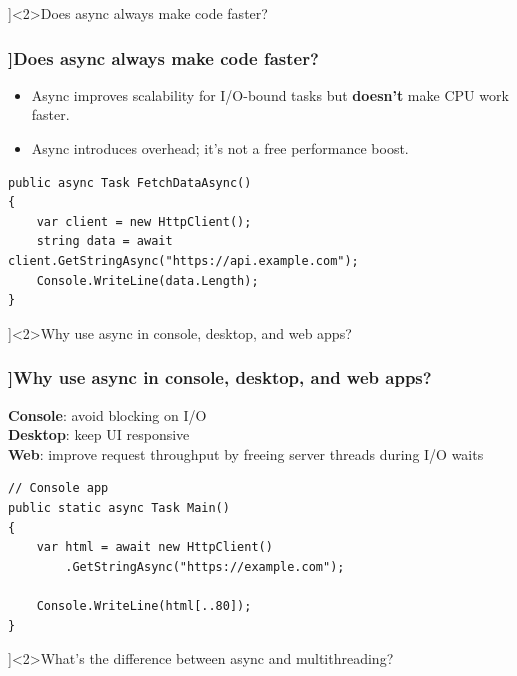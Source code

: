 \QuestionSlide[\CategoryBadge[PerfColor!20]{Async \& Threading}]<2>{Does async always make code faster?}

\begin{frame}[fragile]
  \frametitle{\AnswerTitle[\CategoryBadge[OOPColor!20]{C\#} ]{Does async always make code faster?}}

  {\footnotesize
  \begin{itemize}
      \item Async improves scalability for I/O-bound tasks but \textbf{doesn't} make CPU work faster.
      \item Async introduces overhead; it's not a free performance boost.
  \end{itemize}
  }

  \begin{verbatim}
public async Task FetchDataAsync()
{
    var client = new HttpClient();
    string data = await client.GetStringAsync("https://api.example.com");
    Console.WriteLine(data.Length);
}
  \end{verbatim}
\end{frame}

\QuestionSlide[\CategoryBadge[PerfColor!20]{Async \& Threading}]<2>{Why use async in console, desktop, and web apps?}

\begin{frame}[fragile]
  \frametitle{\AnswerTitle[\CategoryBadge[OOPColor!20]{C\#} ]{Why use async in console, desktop, and web apps?}}

  {\footnotesize
  \textbf{Console}: avoid blocking on I/O\\
  \textbf{Desktop}: keep UI responsive\\
  \textbf{Web}: improve request throughput by freeing server threads during I/O waits
  }

  \begin{verbatim}
// Console app
public static async Task Main()
{
    var html = await new HttpClient()
        .GetStringAsync("https://example.com");

    Console.WriteLine(html[..80]);
}
  \end{verbatim}
\end{frame}

\QuestionSlide[\CategoryBadge[PerfColor!20]{Async \& Threading}]<2>{What's the difference between async and multithreading?}

